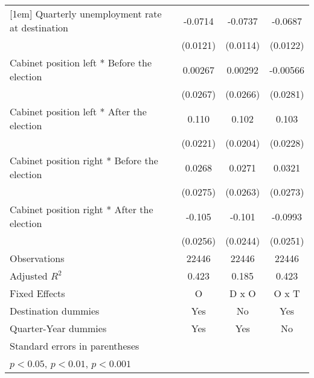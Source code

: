\begin{table}[htbp]
\begin{tabular}{l*{3}{c}}
[1em]
Quarterly unemployment rate at destination&     -0.0714\sym{***}&     -0.0737\sym{***}&     -0.0687\sym{***}\\
                    &    (0.0121)         &    (0.0114)         &    (0.0122)         \\
[1em]
Cabinet position left * Before the election&     0.00267         &     0.00292         &    -0.00566         \\
                    &    (0.0267)         &    (0.0266)         &    (0.0281)         \\
[1em]
Cabinet position left * After the election&       0.110\sym{***}&       0.102\sym{***}&       0.103\sym{***}\\
                    &    (0.0221)         &    (0.0204)         &    (0.0228)         \\
[1em]
Cabinet position right * Before the election&      0.0268         &      0.0271         &      0.0321         \\
                    &    (0.0275)         &    (0.0263)         &    (0.0273)         \\
[1em]
Cabinet position right * After the election&      -0.105\sym{***}&      -0.101\sym{***}&     -0.0993\sym{***}\\
                    &    (0.0256)         &    (0.0244)         &    (0.0251)         \\
\hline
Observations        &       22446         &       22446         &       22446         \\
Adjusted \(R^{2}\)  &       0.423         &       0.185         &       0.423         \\
Fixed Effects       &           O         &       D x O         &       O x T         \\
Destination dummies &         Yes         &          No         &         Yes         \\
Quarter-Year dummies&         Yes         &         Yes         &          No         \\
\hline\hline
\multicolumn{4}{l}{\footnotesize Standard errors in parentheses}\\
\multicolumn{4}{l}{\footnotesize \sym{*} \(p<0.05\), \sym{**} \(p<0.01\), \sym{***} \(p<0.001\)}\\
\end{tabular}
\end{table}
